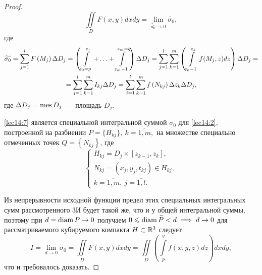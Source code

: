 \documentclass[../../main.tex]{subfiles}
\begin{document}
\begin{proof}
		\begin{equation}
		\iint\limits_D F\left(x, y\right) dxdy = \lim\limits_{\widetilde{d_0} 
		\to 0} \widetilde{\sigma_0}, \label{lec14:6}
		\end{equation}
		где 
		\begin{equation}
		\begin{gathered}
		\widetilde{\sigma_0} = \sum\limits_{j = 1}^{l} F\left(M_j\right) \Delta 
		D_j = \left(\int\limits_{z_0 = p}^{z_1} + \ldots + \int\limits_{z_m - 
		1}^{z_m = q} \right)\Delta D_j = \sum\limits_{j = 1}^{l} \sum\limits_{k = 1}^{m} 
		\left(\int\limits_{z_k - 1}^{z_k} f(M_j, z)dz\right) \Delta D_j = \\ 
		= \sum\limits_{j = 1}^{l} \sum\limits_{k = 1}^{m} I_{kj} \Delta D_j = 
		\sum\limits_{j = 1}^{l} \sum\limits_{k = 1}^{m} f\left(N_{kj}\right) \Delta 
		z_k \Delta D_j, \label{lec14:7}
		\end{gathered}
		\end{equation}
		где $\Delta D_j = \operatorname{mes} D_j$~--- площадь $D_j$.
		
		\eqref{lec14:7} является специальной интегральной суммой $\sigma_0$ для 
		\eqref{lec14:2}, построенной на разбиении $P = \{ H_{kj} \},\ k = 
		\overline{1, m},$ на множестве специально отмеченных точек $Q = \left\{ 
		N_{kj}\right\}$, где 
		\[
		\begin{cases}
		H_{kj} = D_j \times \left[z_{k - 1}, z_k\right],\\
		N_{kj} = (x_j, y_j, t_{kj}) \in H_{kj}, \\
		k = \overline{1, m}, \ j = \overline{1, l}.
		\end{cases} 
		\]
		
		Из непрерывности исходной функции предел этих специальных интегральных сумм 
		рассмотренного 3И будет такой же, что и у общей интегральной суммы, поэтому 
		при $d = \operatorname{diam} P \to 0$ получаем $0 \leqslant \operatorname{diam} \widetilde{P} < d \implies d 
		\to 0$ для рассматриваемого кубируемого компакта $H \subset \mathbb{R}^3$ следует
		\begin{equation}
		I = \lim\limits_{d \to 0} \sigma_0 = \iint\limits_D  F\left(x, y\right) dxdy 
		= 
		\iint\limits_D \left(\int\limits_{p}^{q} f(x, y,z) dz\right) 
		dxdy, \label{lec14:9}
		\end{equation}
		что и требовалось доказать.
	\end{proof}
	
\end{document}
